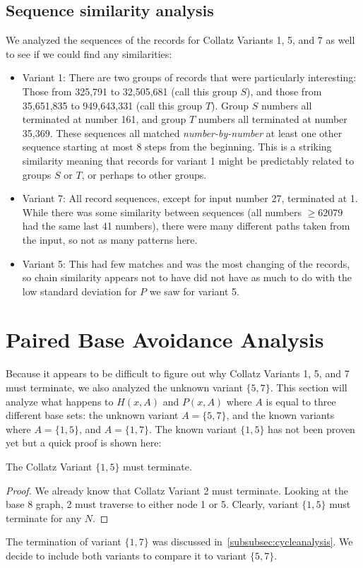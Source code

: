 \subsection{Sequence similarity analysis} \label{subsubsec:algseqsim}
We analyzed the sequences of the records for Collatz Variants 1, 5, and 7 as well to see if we could find any similarities:
\begin{itemize}
    \item Variant 1: There are two groups of records that were particularly interesting: Those from 325,791 to 32,505,681 (call this group $S$), and those from 35,651,835 to 949,643,331 (call this group $T$). Group $S$ numbers all terminated at number 161, and group $T$ numbers all terminated at number 35,369. These sequences all matched \textit{number-by-number} at least one other sequence starting at most 8 steps from the beginning. This is a striking similarity meaning that records for variant 1 might be predictably related to groups $S$ or $T$, or perhaps to other groups.
    \item Variant 7: All record sequences, except for input number 27, terminated at 1. While there was some similarity between sequences (all numbers $\geq 62079$ had the same last 41 numbers), there were many different paths taken from the input, so not as many patterns here.
    \item Variant 5: This had few matches and was the most changing of the records, so chain similarity appears not to have did not have as much to do with the low standard deviation for $P$ we saw for variant 5. 
\end{itemize}
\section{Paired Base Avoidance Analysis} \label{subsec:algpairedbase}
Because it appears to be difficult to figure out why Collatz Variants 1, 5, and 7 must terminate, we also analyzed the unknown variant $\{5,7\}$. This section will analyze what happens to $H(x,A)$ and $P(x,A)$ where $A$ is equal to three different base sets: the unknown variant $A=\{5,7\}$, and the known variants where $A=\{1,5\}$, and $A=\{1,7\}$. The known variant $\{1, 5\}$ has not been proven yet but a quick proof is shown here:
\begin{lemma}
The Collatz Variant $\{1, 5\}$ must terminate.
\end{lemma}
\begin{proof}
We already know that Collatz Variant 2 must terminate. Looking at the base 8 graph, 2 must traverse to either node 1 or 5. Clearly, variant $\{1, 5\}$ must terminate for any $N$.
\end{proof}
The termination of variant $\{1, 7\}$ was discussed in~\ref{subsubsec:cycleanalysis}. We decide to include both variants to compare it to variant $\{5, 7\}$.

